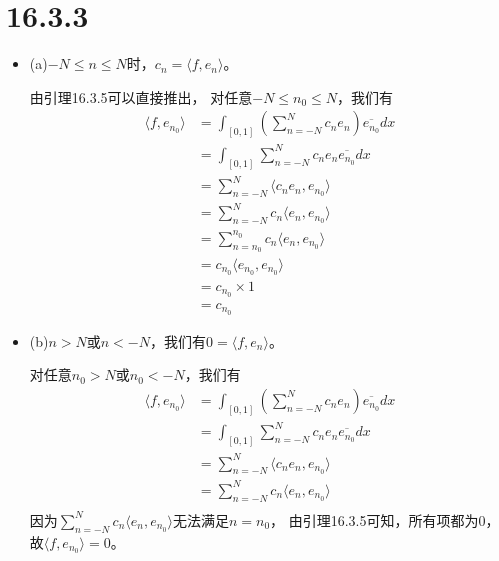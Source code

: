 \documentclass{article}
\begin{document}
\section*{16.3.3}

\begin{itemize}
  \item (a)$-N \leq n \leq N$时，$c_n = \langle f, e_n \rangle$。

        由引理16.3.5可以直接推出，
        对任意$-N \leq n_0 \leq N$，我们有
        \begin{align*}
          \langle f, e_{n_0} \rangle
           & = \int_{[0, 1]} \left(\sum\limits_{n = -N}^N c_n e_n\right) \overline{e_{n_0}} dx \\
           & = \int_{[0, 1]} \sum\limits_{n = -N}^N c_n e_n\overline{e_{n_0}} dx               \\
           & = \sum\limits_{n = -N}^N \langle c_ne_n, e_{n_0} \rangle                          \\
           & = \sum\limits_{n = -N}^N c_n\langle e_n, e_{n_0} \rangle                          \\
           & = \sum\limits_{n = n_0}^{n_0} c_n\langle e_n, e_{n_0} \rangle                     \\
           & = c_{n_0}\langle e_{n_0}, e_{n_0} \rangle                                         \\
           & = c_{n_0} \times 1                                                                \\
           & = c_{n_0}
        \end{align*}

  \item (b)$n > N$或$n < -N$，我们有$0 = \langle f, e_n \rangle$。

        对任意$n_0 > N$或$n_0 < -N$，我们有
        \begin{align*}
          \langle f, e_{n_0} \rangle
           & = \int_{[0, 1]} \left(\sum\limits_{n = -N}^N c_n e_n\right) \overline{e_{n_0}} dx \\
           & = \int_{[0, 1]} \sum\limits_{n = -N}^N c_n e_n\overline{e_{n_0}} dx               \\
           & = \sum\limits_{n = -N}^N \langle c_ne_n, e_{n_0} \rangle                          \\
           & = \sum\limits_{n = -N}^N c_n\langle e_n, e_{n_0} \rangle                          \\
        \end{align*}
        因为$\sum\limits_{n = -N}^N c_n\langle e_n, e_{n_0} \rangle$无法满足$n = n_0$，
        由引理16.3.5可知，所有项都为0，
        故$\langle f, e_{n_0} \rangle = 0$。


\end{itemize}
\end{document}

